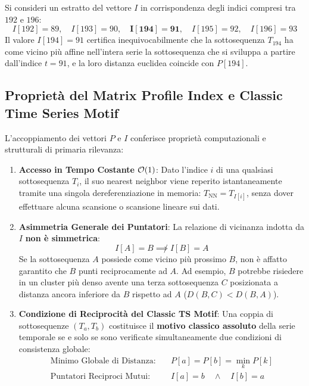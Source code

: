 \begin{example}
Si consideri un estratto del vettore $I$ in corrispondenza degli indici compresi tra $192$ e $196$:
\begin{equation}
I[192] = 89, \quad I[193] = 90, \quad \mathbf{I[194] = 91}, \quad I[195] = 92, \quad I[196] = 93
\end{equation}
Il valore $I[194] = 91$ certifica inequivocabilmente che la sottosequenza $T_{194}$ ha come vicino pi\`u affine nell'intera serie la sottosequenza che si sviluppa a partire dall'indice $t = 91$, e la loro distanza euclidea coincide con $P[194]$.
\end{example}

\FloatBarrier
\subsection{Propriet\`a del Matrix Profile Index e Classic Time Series Motif}
\label{subsec:ts-mpi-properties-classic-motif}

L'accoppiamento dei vettori $P$ e $I$ conferisce propriet\`a computazionali e strutturali di primaria rilevanza:

\begin{enumerate}
    \item \textbf{Accesso in Tempo Costante $\mathcal{O}\!\left(1\right)$}: 
    Dato l'indice $i$ di una qualsiasi sottosequenza $T_i$, il suo nearest neighbor viene reperito istantaneamente tramite una singola dereferenziazione in memoria: $T_{\text{NN}} = T_{I[i]}$, senza dover effettuare alcuna scansione o scansione lineare sui dati.
    
    \item \textbf{Asimmetria Generale dei Puntatori}: 
    La relazione di vicinanza indotta da $I$ \textbf{non \`e simmetrica}:
    \begin{equation}
    I[A] = B \not\implies I[B] = A
    \end{equation}
    Se la sottosequenza $A$ possiede come vicino pi\`u prossimo $B$, non \`e affatto garantito che $B$ punti reciprocamente ad $A$. Ad esempio, $B$ potrebbe risiedere in un cluster pi\`u denso avente una terza sottosequenza $C$ posizionata a distanza ancora inferiore da $B$ rispetto ad $A$ ($D(B, C) < D(B, A)$).
    
    \item \textbf{Condizione di Reciprocit\`a del Classic TS Motif}:
    Una coppia di sottosequenze $(T_a, T_b)$ costituisce il \textbf{motivo classico assoluto} della serie temporale se e solo se sono verificate simultaneamente due condizioni di consistenza globale:
    \begin{align}
    \text{Minimo Globale di Distanza:} \quad & P[a] = P[b] = \min_{k} P[k] \label{eq:motif-cond-min} \\
    \text{Puntatori Reciproci Mutui:} \quad & I[a] = b \quad \land \quad I[b] = a \label{eq:motif-cond-mutual}
    \end{align}
\end{enumerate}


